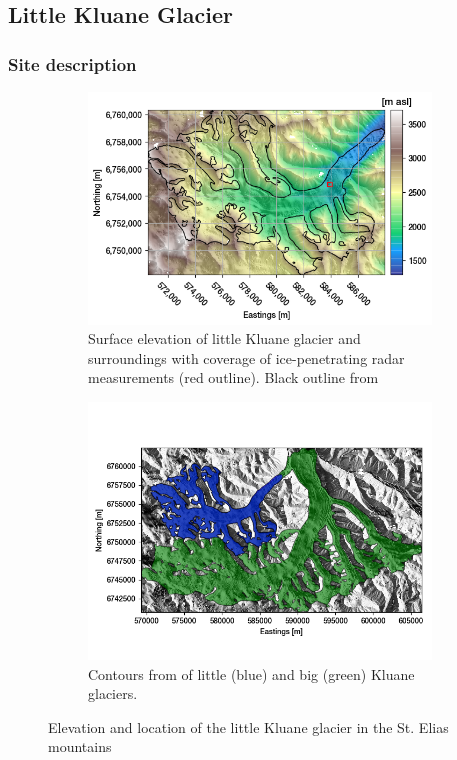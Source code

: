 \documentclass[a4, 12pt]{article}
\begin{document}
\subsection{Little Kluane Glacier}
\subsubsection{Site description}
\begin{figure}[h!]
\centering
\begin{subfigure}[c]{1\textwidth}
\centering
\includegraphics[scale=0.65]{../imgs/little Kluane glacier, post-surge/elevation.png}
\caption{Surface elevation of little Kluane glacier and surroundings with coverage of ice-penetrating radar measurements (red outline). Black outline from \citet{pfeffer2014randolph}}
\label{fig:lk_dem}
\end{subfigure}
\begin{subfigure}[c]{1\textwidth}
\centering
\includegraphics[scale=0.65]{../imgs/little Kluane glacier, post-surge/kluane_outlines.png}
\caption{Contours from \citet{pfeffer2014randolph} of little (blue) and big (green) Kluane glaciers.}
\label{fig:lk_outlines}
\end{subfigure}
\label{fig:lk_figs}
\caption{Elevation and location of the little Kluane glacier in the St. Elias mountains}
\end{figure}
\end{document}
